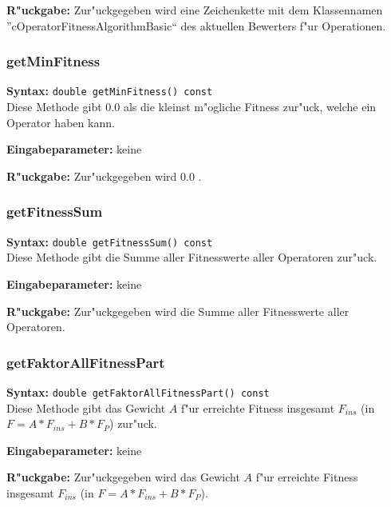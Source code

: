 \bigskip\noindent
\textbf{R"uckgabe:} Zur"uckgegeben wird eine Zeichenkette mit dem Klassennamen ''cOperatorFitnessAlgorithmBasic`` des aktuellen Bewerters f"ur Operationen.


\subsubsection{getMinFitness}

\textbf{Syntax:} \verb|double getMinFitness() const| \\

Diese Methode gibt $0.0$ als die kleinst m"ogliche Fitness zur"uck, welche ein Operator haben kann.

\bigskip\noindent
\textbf{Eingabeparameter:} keine

\bigskip\noindent
\textbf{R"uckgabe:} Zur"uckgegeben wird $0.0$ .


\subsubsection{getFitnessSum}

\textbf{Syntax:} \verb|double getFitnessSum() const| \\

Diese Methode gibt die Summe aller Fitnesswerte aller Operatoren zur"uck.

\bigskip\noindent
\textbf{Eingabeparameter:} keine

\bigskip\noindent
\textbf{R"uckgabe:} Zur"uckgegeben wird die Summe aller Fitnesswerte aller Operatoren.


\subsubsection{getFaktorAllFitnessPart}

\textbf{Syntax:} \verb|double getFaktorAllFitnessPart() const| \\

Diese Methode gibt das Gewicht $A$ f"ur erreichte Fitness insgesamt $F_{ins}$ (in $F=A*F_{ins}+B*F_P$) zur"uck.

\bigskip\noindent
\textbf{Eingabeparameter:} keine

\bigskip\noindent
\textbf{R"uckgabe:} Zur"uckgegeben wird das Gewicht $A$ f"ur erreichte Fitness insgesamt $F_{ins}$ (in $F=A*F_{ins}+B*F_P$).



